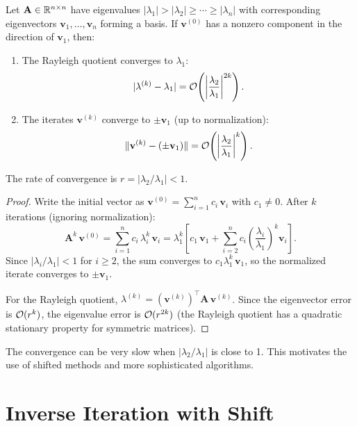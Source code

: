 \begin{theorem}
\label{thm:power-convergence}
Let $\mathbf{A} \in \mathbb{R}^{n \times n}$ have eigenvalues $|\lambda_1| > |\lambda_2| \geq \cdots \geq |\lambda_n|$ with corresponding eigenvectors $\mathbf{v}_1, \ldots, \mathbf{v}_n$ forming a basis. If $\mathbf{v}^{(0)}$ has a nonzero component in the direction of $\mathbf{v}_1$, then:
\begin{enumerate}
    \item The Rayleigh quotient converges to $\lambda_1$:
    \[
        |\lambda^{(k)} - \lambda_1| = \mathcal{O}\!\left(\left|\frac{\lambda_2}{\lambda_1}\right|^{2k}\right).
    \]
    \item The iterates $\mathbf{v}^{(k)}$ converge to $\pm\mathbf{v}_1$ (up to normalization):
    \[
        \|\mathbf{v}^{(k)} - (\pm\mathbf{v}_1)\| = \mathcal{O}\!\left(\left|\frac{\lambda_2}{\lambda_1}\right|^k\right).
    \]
\end{enumerate}
The rate of convergence is $r = |\lambda_2/\lambda_1| < 1$.
\end{theorem}

\begin{proof}
Write the initial vector as $\mathbf{v}^{(0)} = \sum_{i=1}^{n} c_i\,\mathbf{v}_i$ with $c_1 \neq 0$. After $k$ iterations (ignoring normalization):
\[
    \mathbf{A}^k\,\mathbf{v}^{(0)} = \sum_{i=1}^{n} c_i\,\lambda_i^k\,\mathbf{v}_i = \lambda_1^k\left[c_1\,\mathbf{v}_1 + \sum_{i=2}^{n} c_i\left(\frac{\lambda_i}{\lambda_1}\right)^k \mathbf{v}_i\right].
\]
Since $|\lambda_i/\lambda_1| < 1$ for $i \geq 2$, the sum converges to $c_1\lambda_1^k\,\mathbf{v}_1$, so the normalized iterate converges to $\pm\mathbf{v}_1$.

For the Rayleigh quotient, $\lambda^{(k)} = (\mathbf{v}^{(k)})^\top\mathbf{A}\,\mathbf{v}^{(k)}$. Since the eigenvector error is $\mathcal{O}(r^k)$, the eigenvalue error is $\mathcal{O}(r^{2k})$ (the Rayleigh quotient has a quadratic stationary property for symmetric matrices).
\end{proof}

\begin{remark}
The convergence can be very slow when $|\lambda_2/\lambda_1|$ is close to 1. This motivates the use of shifted methods and more sophisticated algorithms.
\end{remark}

\section{Inverse Iteration with Shift}

